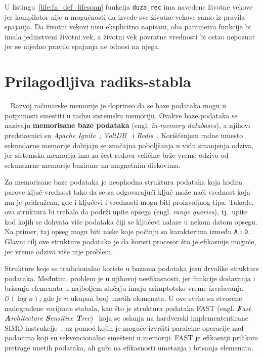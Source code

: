 \documentclass[12pt,oneside]{memoir}
\begin{document}
U listingu~\ref{life:fn_def_lifespan} funkcija \texttt{duza\_rec} ima navedene životne
vekove jer kompilator nije u mogućnosti da izvede sve životne vekove samo iz
pravila spajanja. Da životni vekovi nisu eksplicitno napisani, oba parametra funkcije
bi imala jedinstveni životni vek, a životni vek povratne vrednosti bi ostao nepoznat
jer se nijedno pravilo spajanja ne odnosi na njega.


\chapter{Prilagodljiva radiks-stabla}~\label{ch:art}
Razvoj računarske memorije je doprineo da se baze podataka
mogu u potpunosti smestiti u radnu sistemsku memoriju. Ovakve baze podataka se nazivaju
\textbf{memorisane baze podataka} (engl. \emph{in-memory databases}), a njihovi predstavnici su
\emph{Apache Ignite}~\cite{apacheIgnite}, \emph{VoltDB}~\cite{voltDB} i
\emph{Redis}~\cite{redis}. Korišćenjem radne umesto sekundarne
memorije dobijaju se značajna poboljšanja u vidu smanjenja odziva, jer sistemska memorija
ima za šest redova veličine brže vreme odziva
od sekundarne memorije bazirane na magnetnim diskovima.

Za memorisane baze podataka je neophodna struktura podataka koja kodira parove
ključ-vrednost tako da se za odgovarajući ključ može naći vrednost koja mu
je pridružena, gde i ključevi i vrednosti mogu biti proizvoljnog tipa.
Takođe, ova struktura bi trebalo da podrži upite opsega
(engl. \emph{range queries}), tj.\ upite kod kojih se dohvata više podataka
čiji se ključevi nalaze u nekom datom opsegu.
Na primer, taj opseg mogu biti niske koje počinju sa karakterima između
\texttt{A} i \texttt{D}.
Glavni cilj ove strukture podataka je da koristi procesor što je efikasnije moguće, jer
vreme odziva više nije problem.

Strukture koje se tradicionalno koriste u bazama podataka jesu
drvolike strukture podataka. Međutim, problem je u njihovoj neefikasnosti, jer
funkcije dodavanja i brisanja elemenata u najboljem slučaju imaju asimptotsko vreme izvršavanja
$ \mathcal{O}(\log{}n) $, gde je $n$ ukupan broj unetih elemenata.
U ove svrhe su stvorene nadograđene varijante stabala,
kao što je struktura podataka FAST
(engl. \emph{\textbf{F}ast \textbf{A}rchitecture \textbf{S}ensitive \textbf{T}ree})~\cite{fast}
koja se oslanja na hardverski implemententirane SIMD instrukcije~\cite{simd},
uz pomoć kojih je moguće izvršiti paralelne operacije nad podacima koji su
sekvencionalno smešteni u memoriji.
FAST je efikasniji prilikom pretrage unetih podataka,
ali gubi na efikasnosti umetanja i brisanja elemenata.
\end{document}

